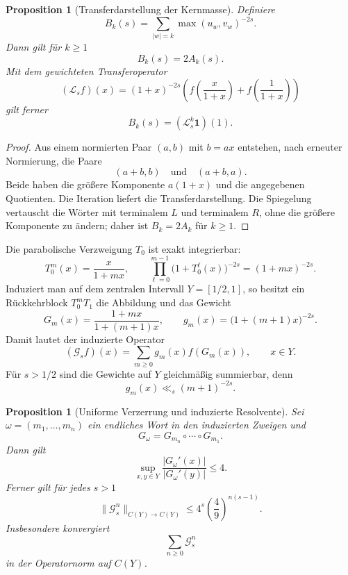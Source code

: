 \documentclass[11pt,a4paper]{article}
\newtheorem{proposition}[remark]{Proposition}
\begin{document}
\begin{proposition}[Transferdarstellung der Kernmasse]
Definiere
\[
 B_k(s)=\sum_{|w|=k}\max(u_w,v_w)^{-2s}.
\]
Dann gilt für $k\ge1$
\[
 B_k(s)=2A_k(s).
\]
Mit dem gewichteten Transferoperator
\[
 (\mathcal L_sf)(x)
 =(1+x)^{-2s}
 \left(
 f\!\left(\frac{x}{1+x}\right)
 +f\!\left(\frac{1}{1+x}\right)
 \right)
\]
gilt ferner
\[
 B_k(s)=(\mathcal L_s^k\mathbf 1)(1).
\]
\end{proposition}

\begin{proof}
Aus einem normierten Paar $(a,b)$ mit $b=ax$ entstehen, nach erneuter
Normierung, die Paare
\[
 (a+b,b)
 \quad\text{und}\quad
 (a+b,a).
\]
Beide haben die größere Komponente $a(1+x)$ und die angegebenen
Quotienten. Die Iteration liefert die Transferdarstellung. Die Spiegelung
vertauscht die Wörter mit terminalem $L$ und terminalem $R$, ohne die
größere Komponente zu ändern; daher ist $B_k=2A_k$ für $k\ge1$.
\end{proof}

Die parabolische Verzweigung $T_0$ ist exakt integrierbar:
\[
 T_0^m(x)=\frac{x}{1+mx},
 \qquad
 \prod_{\ell=0}^{m-1}
 \bigl(1+T_0^\ell(x)\bigr)^{-2s}
 =(1+mx)^{-2s}.
\]
Induziert man auf dem zentralen Intervall
$Y=[1/2,1]$, so besitzt ein Rückkehrblock
$T_0^mT_1$ die Abbildung und das Gewicht
\[
 G_m(x)=\frac{1+mx}{1+(m+1)x},
 \qquad
 g_m(x)=\bigl(1+(m+1)x\bigr)^{-2s}.
\]
Damit lautet der induzierte Operator
\[
 (\mathcal G_sf)(x)
 =\sum_{m\ge0}g_m(x)f(G_m(x)),
 \qquad x\in Y.
\]
Für $s>1/2$ sind die Gewichte auf $Y$ gleichmäßig summierbar, denn
\[
 g_m(x)\ll_s (m+1)^{-2s}.
\]

\begin{proposition}[Uniforme Verzerrung und induzierte Resolvente]
Sei $\omega=(m_1,\ldots,m_n)$ ein endliches Wort in den induzierten
Zweigen und
\[
 G_\omega=G_{m_n}\circ\cdots\circ G_{m_1}.
\]
Dann gilt
\[
 \sup_{x,y\in Y}
 \frac{|G_\omega'(x)|}{|G_\omega'(y)|}\le4.
\]
Ferner gilt für jedes $s>1$
\[
 \|\mathcal G_s^n\|_{C(Y)\to C(Y)}
 \le
 4^s\left(\frac49\right)^{n(s-1)}.
\]
Insbesondere konvergiert
\[
 \sum_{n\ge0}\mathcal G_s^n
\]
in der Operatornorm auf $C(Y)$.
\end{proposition}
\end{document}
